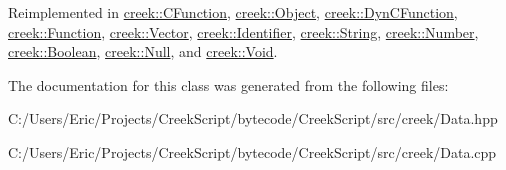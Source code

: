 Reimplemented in \hyperlink{classcreek_1_1_c_function_a0adf7ffcb7f3a4e8f81f744477dc44b7}{creek\+::\+C\+Function}, \hyperlink{classcreek_1_1_object_a65f18a4791281093084bc8a92a82443b}{creek\+::\+Object}, \hyperlink{classcreek_1_1_dyn_c_function_a19c3af888a7cdaadd01094fe0e0a52f0}{creek\+::\+Dyn\+C\+Function}, \hyperlink{classcreek_1_1_function_ae31495346f72a6bdcd9f469d94bd1f6e}{creek\+::\+Function}, \hyperlink{classcreek_1_1_vector_a1591fa8c4a2c655687d806d762ef235a}{creek\+::\+Vector}, \hyperlink{classcreek_1_1_identifier_a30bee250de22c4627fed84c0518b06d0}{creek\+::\+Identifier}, \hyperlink{classcreek_1_1_string_aef637e0c37e6ff5dcf7b59a18d729603}{creek\+::\+String}, \hyperlink{classcreek_1_1_number_acb6a31981f3bd3d0e43846d540301997}{creek\+::\+Number}, \hyperlink{classcreek_1_1_boolean_a4cb36d7dd280511ae75aec5d8c1ef082}{creek\+::\+Boolean}, \hyperlink{classcreek_1_1_null_a27a09414de32a2f76ba5a98cfb565c9a}{creek\+::\+Null}, and \hyperlink{classcreek_1_1_void_addfb8b716d2f9cdd92de009460aa2f7b}{creek\+::\+Void}.



The documentation for this class was generated from the following files\+:\begin{DoxyCompactItemize}
\item 
C\+:/\+Users/\+Eric/\+Projects/\+Creek\+Script/bytecode/\+Creek\+Script/src/creek/Data.\+hpp\item 
C\+:/\+Users/\+Eric/\+Projects/\+Creek\+Script/bytecode/\+Creek\+Script/src/creek/Data.\+cpp\end{DoxyCompactItemize}
